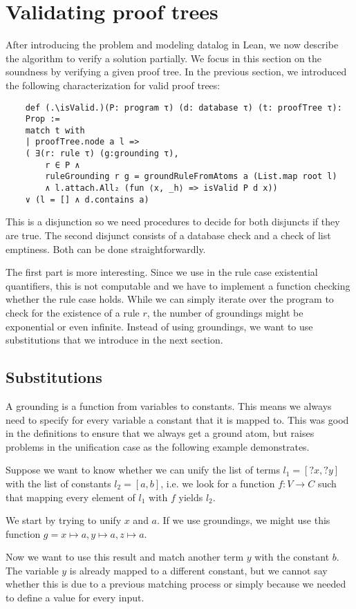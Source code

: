 \chapter{Validating proof trees}\label{sec:valTree}

After introducing the problem and modeling datalog in Lean, we now describe the algorithm to verify a solution partially. We focus in this section on the soundness by verifying a given proof tree. In the previous section, we introduced the following characterization for valid proof trees:

\begin{lstlisting}
    def (.\isValid.)(P: program τ) (d: database τ) (t: proofTree τ): 
    Prop :=
    match t with
    | proofTree.node a l => 
    ( ∃(r: rule τ) (g:grounding τ), 
        r ∈ P ∧ 
        ruleGrounding r g = groundRuleFromAtoms a (List.map root l)
        ∧ l.attach.All₂ (fun ⟨x, _h⟩ => isValid P d x)) 
    ∨ (l = [] ∧ d.contains a)
\end{lstlisting}

This is a disjunction so we need procedures to decide for both disjuncts if they are true.
The second disjunct consists of a database check and a check of list emptiness. Both can be done straightforwardly.

The first part is more interesting. Since we use in the rule case existential quantifiers, this is not computable and we have to implement a function checking whether the rule case holds. While we can simply iterate over the program to check for the existence of a rule $r$, the number of groundings might be exponential or even infinite. Instead of using groundings, we want to use substitutions that we introduce in the next section.


\section{Substitutions}
    A grounding is a function from variables to constants. This means we always need to specify for every variable a constant that it is mapped to. This was good in the definitions to ensure that we always get a ground atom, but raises problems in the unification case as the following example demonstrates.

    \begin{example}\label{ex:subsGroun}
        Suppose we want to know whether we can unify the list of terms $l_1 = [?x, ?y]$ with the list of constants $l_2= [a,b]$, i.e. we look for a function $f: V \to C$ such that mapping every element of $l_1$ with $f$ yields $l_2$.

        We start by trying to unify $x$ and $a$. If we use groundings, we might use this function $g = x \mapsto a, y \mapsto a, z \mapsto a$.

        Now we want to use this result and match another term $y$ with the constant $b$. The variable $y$ is already mapped to a different constant, but we cannot say whether this is due to a previous matching process or simply because we needed to define a value for every input.         
    \end{example}
    
